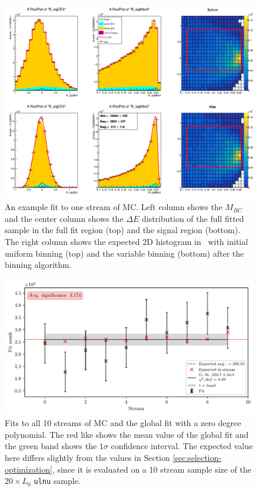 \begin{figure}[H]
	\centering
	\captionsetup{width=0.8\linewidth}
	\includegraphics[width=\linewidth]{fig/plt_uMVA1dc_0.png}
	\caption{An example fit to one stream of MC. Left column shows the $M_{BC}$ and the center column shows the $\Delta E$ distribution of the full fitted sample in the full fit region (top) and the signal region (bottom). The right column shows the expected 2D histogram in \vars~with initial uniform binning (top) and the variable binning (bottom) after the binning algorithm.}
	\label{fig:sig_streamfit}
\end{figure}


\begin{figure}[H]
	\centering
	\captionsetup{width=0.8\linewidth}
	\includegraphics[width=\linewidth]{fig/sig_global}
	\caption{Fits to all 10 streams of MC and the global fit with a zero degree polynomial. The red like shows the mean value of the global fit and the green band shows the $1\sigma$ confidence interval. The expected value here differs slightly from the values in Section \ref{sec:selection-optimization}, since it is evaluated on a 10 stream sample size of the $20\times L_0$ \texttt{ulnu} sample.}
	\label{fig:sig_global}
\end{figure}

